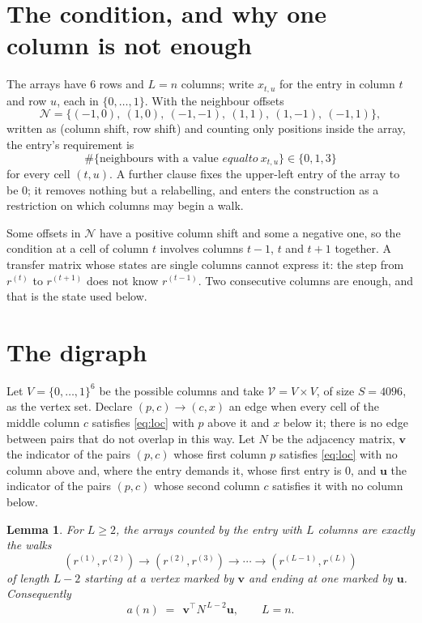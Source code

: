 \documentclass[11pt,a4paper]{article}
\theoremstyle{plain}
\newtheorem{lemma}[theorem]{Lemma}
\theoremstyle{definition}
\begin{document}
\section{The condition, and why one column is not enough}

The arrays have $6$ rows and $L=n$ columns; write $x_{t,u}$ for the entry in
column $t$ and row $u$, each in $\{0,\dots,1\}$. With the neighbour offsets
\[
\mathcal N=\{(-1,0),\ (1,0),\ (-1,-1),\ (1,1),\ (1,-1),\ (-1,1)\},
\]
written as (column shift, row shift) and counting only positions inside the array, the
entry's requirement is
\begin{equation}\label{eq:loc}
\#\{\text{neighbours with a value }equal to\ x_{t,u}\}\in\{0,1,3\}
\end{equation}
for every cell $(t,u)$. A further clause fixes the upper-left entry of the array to be $0$; it removes nothing but a relabelling, and enters the construction as a restriction on which columns may begin a walk.

Some offsets in $\mathcal N$ have a positive column shift and some a negative one, so the
condition at a cell of column $t$ involves columns $t-1$, $t$ and $t+1$ together. A transfer
matrix whose states are single columns cannot express it: the step from $r^{(t)}$ to
$r^{(t+1)}$ does not know $r^{(t-1)}$. Two consecutive columns are enough, and that is
the state used below.

\section{The digraph}

Let $V=\{0,\dots,1\}^{6}$ be the possible columns and take
$\mathcal V=V\times V$, of size $S=4096$, as the vertex set. Declare $(p,c)\to(c,x)$ an edge
when every cell of the middle column $c$ satisfies \eqref{eq:loc} with $p$ above it and $x$
below it; there is no edge between pairs that do not overlap in this way. Let $N$ be the
adjacency matrix, $\mathbf{v}$ the indicator of the pairs $(p,c)$ whose first column $p$
satisfies \eqref{eq:loc} with no column above and, where the entry demands it, whose first entry is $0$, and $\mathbf{u}$ the indicator of
the pairs $(p,c)$ whose second column $c$ satisfies it with no column below.

\begin{lemma}\label{lem:walk}
For $L\ge2$, the arrays counted by the entry with $L$ columns are exactly the walks
\[
(r^{(1)},r^{(2)})\to(r^{(2)},r^{(3)})\to\cdots\to(r^{(L-1)},r^{(L)})
\]
of length $L-2$ starting at a vertex marked by $\mathbf{v}$ and ending at one marked by
$\mathbf{u}$. Consequently
\[
a(n)\;=\;\,\mathbf{v}^{\!\top}N^{\,L-2}\mathbf{u},\qquad L=n .
\]
\end{lemma}
\end{document}
